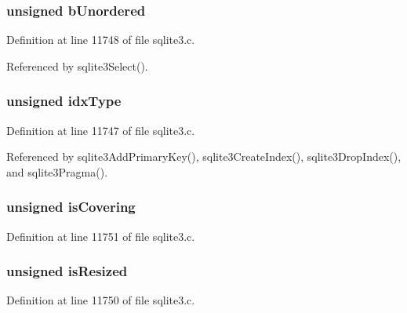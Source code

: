 \hypertarget{struct_index_a80ec7995a89046bf631739246c060d43}{}
\subsubsection[{b\+Unordered}]{\setlength{\rightskip}{0pt plus 5cm}unsigned b\+Unordered}\label{struct_index_a80ec7995a89046bf631739246c060d43}


Definition at line 11748 of file sqlite3.\+c.



Referenced by sqlite3\+Select().

\hypertarget{struct_index_afad240fb2079e16ef9b5a37f9de33d2a}{}
\subsubsection[{idx\+Type}]{\setlength{\rightskip}{0pt plus 5cm}unsigned idx\+Type}\label{struct_index_afad240fb2079e16ef9b5a37f9de33d2a}


Definition at line 11747 of file sqlite3.\+c.



Referenced by sqlite3\+Add\+Primary\+Key(), sqlite3\+Create\+Index(), sqlite3\+Drop\+Index(), and sqlite3\+Pragma().

\hypertarget{struct_index_a753f098d7b22502da28d12ba59dc68f3}{}
\subsubsection[{is\+Covering}]{\setlength{\rightskip}{0pt plus 5cm}unsigned is\+Covering}\label{struct_index_a753f098d7b22502da28d12ba59dc68f3}


Definition at line 11751 of file sqlite3.\+c.

\hypertarget{struct_index_af51f4d44e128b234d35c43e628d59975}{}
\subsubsection[{is\+Resized}]{\setlength{\rightskip}{0pt plus 5cm}unsigned is\+Resized}\label{struct_index_af51f4d44e128b234d35c43e628d59975}


Definition at line 11750 of file sqlite3.\+c.

